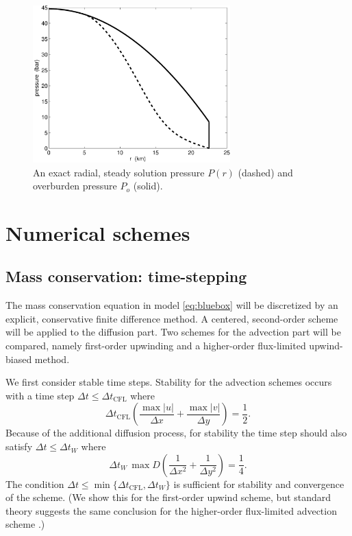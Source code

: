 \documentclass[gmd]{copernicus}   %
\newcommand{\text}{\textrm}
\begin{document}
\begin{figure}[ht]
\includegraphics[width=3.0in,keepaspectratio=true]{exact-P-plot}
\caption{An exact radial, steady solution pressure $P(r)$ (dashed) and overburden pressure $P_o$ (solid).}
\label{fig:Pexact}
\end{figure}


\section{Numerical schemes}  \label{sec:num}

\subsection{Mass conservation: time-stepping}  The mass conservation equation in model \eqref{eq:bluebox} will be discretized by an explicit, conservative finite difference method.   A centered, second-order scheme will be applied to the diffusion part.  Two schemes for the advection part will be compared, namely first-order upwinding and a higher-order flux-limited upwind-biased method.

We first consider stable time steps.  Stability for the advection schemes occurs with a time step $\Delta t \le \Delta t_{\text{CFL}}$ where
\begin{equation}
\Delta t_{\text{CFL}} \left(\frac{\max |u|}{\Delta x} + \frac{\max |v|}{\Delta y}\right) = \frac{1}{2}. \label{eq:dtCFL}
\end{equation}
Because of the additional diffusion process, for stability the time step should also satisfy $\Delta t \le \Delta t_{W}$  where \citep{MortonMayers}
\begin{equation}
\Delta t_W\, \max D \left(\frac{1}{\Delta x^2} + \frac{1}{\Delta y^2}\right) = \frac{1}{4}. \label{eq:dtDIFFW}
\end{equation}
The condition $\Delta t \le \min\{\Delta t_{\text{CFL}}, \Delta t_W\}$ is sufficient for stability and convergence of the scheme.  (We show this for the first-order upwind scheme, but standard theory suggests the same conclusion for the higher-order flux-limited advection scheme \citep{HundsdorferVerwer2010}.)
\end{document}
